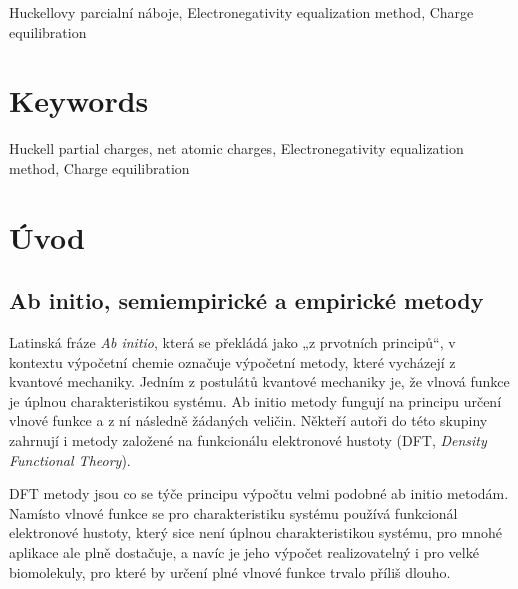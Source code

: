 \documentclass[10pt,draft,oneside]{fithesis2}
\begin{document}
\begin{ThesisKeyWords}
Huckellovy parcialní náboje, Electronegativity equalization method, Charge equilibration

\begingroup
\let\clearpage\relax
{}
\chapter*{Keywords}
\endgroup

Huckell partial charges, net atomic charges, Electronegativity equalization method, Charge equilibration
\end{ThesisKeyWords}

\MainMatter


\tableofcontents

\chapter*{Úvod}


\section{Ab initio, semiempirické a empirické metody}

Latinská fráze \emph{Ab initio}, která se překládá jako „z prvotních principů“, v kontextu výpočetní chemie označuje výpočetní metody, které vycházejí z kvantové mechaniky. Jedním z postulátů kvantové mechaniky je, že vlnová funkce je úplnou charakteristikou systému. Ab initio metody fungují na principu určení vlnové funkce a z ní následně žádaných veličin. Někteří autoři do této skupiny zahrnují i metody založené na funkcionálu elektronové hustoty (DFT,  \textit{\foreignlanguage{english}{Density Functional Theory}}).

DFT metody jsou co se týče principu výpočtu velmi podobné ab initio metodám. Namísto vlnové funkce se pro charakteristiku systému používá funkcionál elektronové hustoty, který sice není úplnou charakteristikou systému, pro mnohé aplikace ale plně dostačuje, a navíc je jeho výpočet realizovatelný i pro velké biomolekuly, pro které by určení plné vlnové funkce trvalo příliš dlouho.
\end{document}
